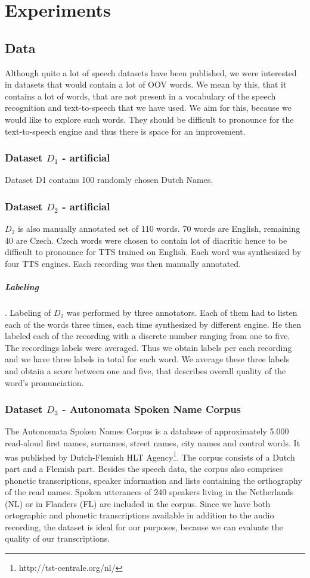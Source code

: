 \chapter{Experiments}
\section{Data}
\label{data-desc}
Although quite a lot of speech datasets have been published, we were interested in datasets that would contain a lot of OOV words.
We mean by this, that it contains a lot of words, that are not present in a vocabulary of the speech recognition and text-to-speech that we have used.
We aim for this, because we would like to explore such words.
They should be difficult to pronounce for the text-to-speech engine and thus there is space for an improvement.
\subsection{Dataset \textbf{$D_1$} - artificial}
Dataset D1 contains 100 randomly chosen Dutch Names.
\subsection{Dataset \textbf{$D_2$} - artificial}
$D_2$ is also manually annotated set of 110 words.
70 words are English, remaining 40 are Czech.
Czech words were chosen to contain lot of diacritic hence to be difficult to pronounce for TTS trained on English.
Each word was synthesized by four TTS engines.
Each recording was then manually annotated.
\paragraph{Labeling}. Labeling of $D_2$  was performed by three annotators. Each of them had to listen each of the words three times, each time synthesized by different engine. He then labeled each of the recording with a discrete number ranging from one to five. The recordings labels were averaged. Thus we obtain labels per each recording and we have three labels in total for each word. We average these three labels and obtain a score between one and five, that describes overall quality of the word's pronunciation.
\subsection{Dataset \textbf{$D_3$} - Autonomata Spoken Name Corpus}
The Autonomata Spoken Names Corpus \cite{van2008autonomata} is a database of approximately 5.000 read-aloud first names, surnames, street names, city names and control words.
It was  published by Dutch-Flemish HLT Agency\footnote{http://tst-centrale.org/nl/}.
The corpus consists of a Dutch part and a Flemish part.
Besides the speech data, the corpus also comprises phonetic transcriptions, speaker information and lists containing the orthography of the read names.
Spoken utterances of 240 speakers living in the Netherlands (NL) or in Flanders (FL) are included in the corpus.
Since we have both ortographic and phonetic transcriptions available in addition to the audio recording, the dataset is ideal for our purposes, because we can evaluate the quality of our transcriptions.
